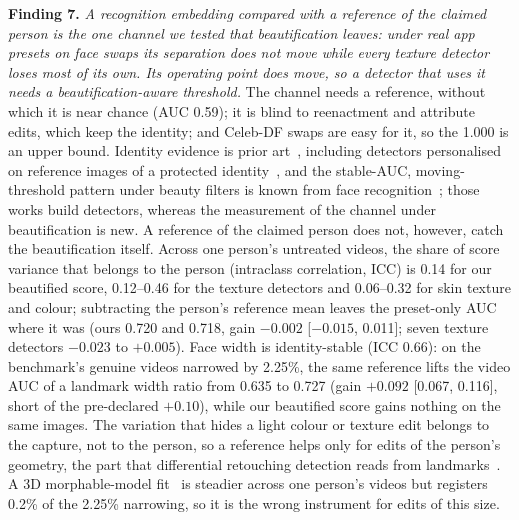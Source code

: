 \documentclass[conference]{IEEEtran}
\begin{document}
\textbf{Finding 7.} \emph{A recognition embedding compared with a reference of the claimed person is the one channel we tested that beautification leaves: under real app presets on face swaps its separation does not move while every texture detector loses most of its own. Its operating point does move, so a detector that uses it needs a beautification-aware threshold.} The channel
needs a reference, without which it is near chance (AUC 0.59); it is blind to reenactment and attribute edits, which keep the
identity; and Celeb-DF swaps are easy for it, so the 1.000 is an upper bound. Identity evidence is prior art~\cite{identitydriven2020,idreveal2021,ict2022,yin2026}, including detectors personalised on reference images of a protected identity~\cite{vipguard2025}, and the stable-AUC, moving-threshold pattern under beauty filters is known from face recognition~\cite{mirabet2025}; those works build detectors, whereas the measurement of the channel under beautification is new.
A reference of the claimed person does not, however, catch the beautification itself. Across one person's untreated
videos, the share of score variance that belongs to the person (intraclass correlation, ICC) is 0.14 for our beautified score,
0.12--0.46 for the texture detectors and 0.06--0.32 for skin texture and colour; subtracting the person's reference mean leaves
the preset-only AUC where it was (ours 0.720 and 0.718, gain $-0.002$ [$-0.015$, 0.011]; seven texture detectors $-0.023$ to
$+0.005$). Face width is identity-stable (ICC 0.66): on the benchmark's genuine videos narrowed by 2.25\%, the same reference
lifts the video AUC of a landmark width ratio from 0.635 to 0.727 (gain $+0.092$ [0.067, 0.116], short of the pre-declared
$+0.10$), while our beautified score gains nothing on the same images. The variation that hides a light colour or texture edit
belongs to the capture, not to the person, so a reference helps only for edits of the person's geometry, the part that
differential retouching detection reads from landmarks~\cite{rathgeb2020diff}. A 3D morphable-model fit~\cite{tddfav2} is
steadier across one person's videos but registers 0.2\% of the 2.25\% narrowing, so it is the wrong instrument for edits of
this size.
\end{document}
